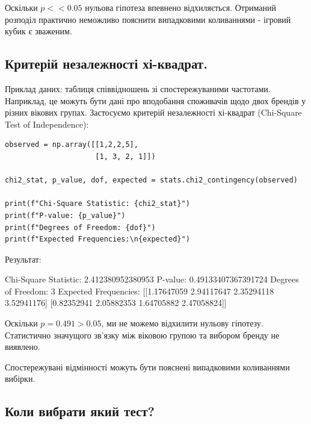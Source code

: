 Оскільки $p << 0.05$ нульова гіпотеза впевнено відхиляється. Отриманий розподіл практично неможливо пояснити випадковими коливаннями - ігровий кубик є зваженим.


\subsection{Критерій незалежності хі-квадрат.}

Приклад даних: таблиця співвідношень зі спостережуваними частотами. Наприклад, це можуть бути дані про вподобання споживачів щодо двох брендів у різних вікових групах. Застосуємо критерій незалежності хі-квадрат (Chi-Square Test of Independence):

\begin{lstlisting}
observed = np.array([[1,2,2,5],
                     [1, 3, 2, 1]])

chi2_stat, p_value, dof, expected = stats.chi2_contingency(observed)

print(f"Chi-Square Statistic: {chi2_stat}")
print(f"P-value: {p_value}")
print(f"Degrees of Freedom: {dof}")
print(f"Expected Frequencies:\n{expected}")
\end{lstlisting}

Результат:

\begin{console}
Chi-Square Statistic: 2.412380952380953
P-value: 0.49133407367391724
Degrees of Freedom: 3
Expected Frequencies:
[[1.17647059 2.94117647 2.35294118 3.52941176]
 [0.82352941 2.05882353 1.64705882 2.47058824]]
\end{console}

Оскільки $p = 0.491 > 0.05$, ми не можемо відхилити нульову гіпотезу. Статистично значущого зв'язку між віковою групою та вибором бренду не виявлено.

Спостережувані відмінності можуть бути пояснені випадковими коливаннями вибірки.

\subsection{Коли вибрати який тест?}


